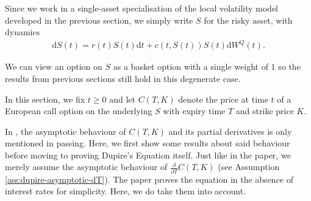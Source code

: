 \documentclass[english]{article}
\numberwithin{equation}{section}
\numberwithin{figure}{section}
\theoremstyle{bolddescit}
\theoremstyle{definition}
\theoremstyle{definition}
\theoremstyle{plain}
\theoremstyle{plain}
\theoremstyle{bolddesc}
\theoremstyle{plain}
\theoremstyle{remark}
\begin{document}
Since we work in a single-asset specialisation of the local volatility model developed in the previous section, we simply write $S$ for the risky asset, with dynamics
\begin{align*}
  \mathrm{d}S(t) = r(t) S(t) \mathrm{d}t + c(t,S(t)) S(t) \mathrm{d}W^Q(t).
\end{align*}

We can view an option on $S$ as a basket option with a single weight of 1 so the results from previous sections still hold in this degenerate case.

In this section, we fix $t \ge 0$ and let $C(T,K)$ denote the price at time $t$ of a European call option on the underlying $S$ with expiry time $T$ and strike price $K$.

In \textcite{dupire_pricing_1993}, the asymptotic behaviour of $C(T,K)$ and its partial derivatives is only mentioned in passing. Here, we first show some results about said behaviour before moving to proving Dupire's Equation itself. Just like in the paper, we merely assume the asymptotic behaviour of $\frac{\partial}{\partial T} C(T,K)$ (see Assumption \ref{ass:dupire-asymptotic-dT}). The paper proves the equation in the absence of interest rates for simplicity. Here, we do take them into account.
\end{document}
